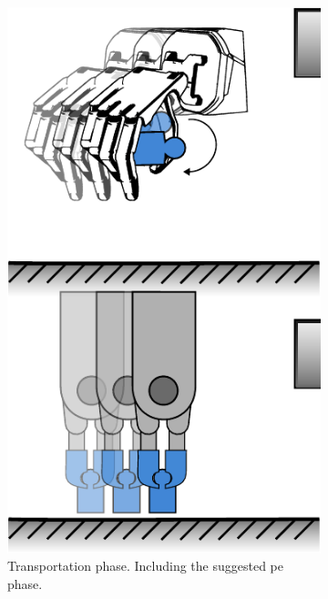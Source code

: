 \begin{figure}[h]
\begin{subfigure}[b]{0.24\textwidth}
		\includegraphics[width=\textwidth]{chapters/introduction/fig/pipeline-3.pdf}
		\caption{Transportation phase. Including the suggested \gls{pe} phase.}
		\label{fig:transportation-phase}
	\end{subfigure}
	\hfill
	\begin{subfigure}[b]{0.24\textwidth}
		\centering

\end{subfigure}
\end{figure}
